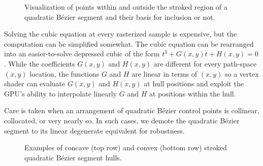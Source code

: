 \begin{figure}[t]
  \caption{\label{fig:quadratic-stroke} Visualization of points within
  and outside the stroked region of a quadratic B\'{e}zier segment and
  their basis for inclusion or not.}
\end{figure}

Solving the cubic equation at every rasterized sample is expensive,
but the computation can be simplified somewhat.  The cubic equation can
be rearranged into an easier-to-solve depressed cubic \cite{Cardano} of
the form $t^3+G(x,y)t+H(x,y)=0$.  While the coefficients $G(x,y)$ and $H(x,y)$
are different for every path-space $(x,y)$ location, the functions $G$ and
$H$ are linear in terms of $(x,y)$ so a vertex shader can evaluate $G(x,y)$
and $H(x,y)$ at hull positions and exploit the GPU's ability to interpolate
linearly $G$ and $H$ at positions within the hull.

Care is taken when an arrangement of quadratic B\'{e}zier control points
is collinear, collocated, or very nearly so.  In such cases, we demote
the quadratic B\'{e}zier segment to its linear degenerate equivalent
for robustness.

\begin{figure}[t]
  \caption{\label{fig:quadratic-hull} Examples of concave (top row)
  and convex (bottom row) stroked quadratic B\'{e}zier segment hulls.}
\end{figure}
 
